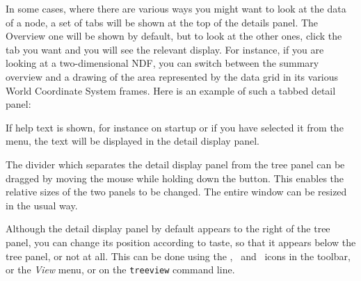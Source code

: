 \documentclass[twoside,11pt]{article}
\renewcommand{\_}{\texttt{\symbol{95}}}
\begin{document}
In some cases, where there are various ways you might want to look
at the data of a node, a set of tabs will be shown at the top of
the details panel.  The Overview one will be shown by default, but
to look at the other ones, click the tab you want and you will see
the relevant display.  For instance, if you are looking at a 
two-dimensional NDF, you can switch between the summary overview 
and a drawing of the area represented by the data grid in its
various World Coordinate System frames.
Here is an example of such a tabbed detail panel:

If help text is shown, for instance on startup or if you have
selected it from the menu, the text will be displayed in the
detail display panel.

The divider which separates the detail display panel from the
tree panel can be dragged by moving the mouse while holding down
the button.  This enables the relative sizes of the two panels
to be changed.  The entire window can be resized in the usual way.

Although the detail display panel by default appears to the right of
the tree panel, you can change its position according to taste, so that it 
appears below the tree panel, or not at all.  This can be done using
the \iconSplitNone, \iconSplitBeside\ and \iconSplitBelow\ 
icons in the toolbar, 
or the {\em View} menu, or on the \texttt{treeview} command line.
\end{document}
